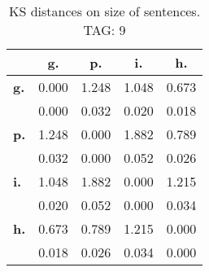 \begin{table}[h!]
\begin{center}
\begin{tabular}{| l || c | c | c | c |}\hline
 & {\bf g.} & {\bf p.} & {\bf i.} & {\bf h.} \\\hline\hline
{\bf g.} & 0.000 & 1.248 & 1.048 & 0.673 \\
{\bf } & 0.000 & 0.032 & 0.020 & 0.018 \\\hline
{\bf p.} & 1.248 & 0.000 & 1.882 & 0.789 \\
{\bf } & 0.032 & 0.000 & 0.052 & 0.026 \\\hline
{\bf i.} & 1.048 & 1.882 & 0.000 & 1.215 \\
{\bf } & 0.020 & 0.052 & 0.000 & 0.034 \\\hline
{\bf h.} & 0.673 & 0.789 & 1.215 & 0.000 \\
{\bf } & 0.018 & 0.026 & 0.034 & 0.000 \\\hline
\end{tabular}
\caption{KS distances on size of sentences. TAG: 9}
\end{center}
\end{table}